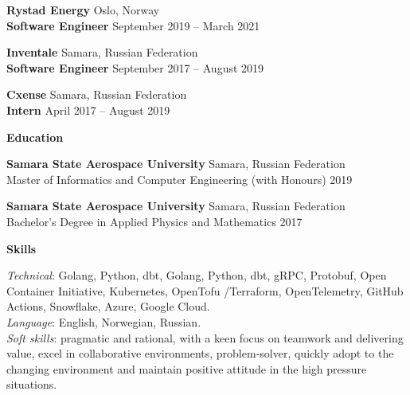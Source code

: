 \documentclass[12pt]{article}
\begin{document}
\vspace{10pt}

\textbf{Rystad Energy} \hfill Oslo, Norway \\
\textbf{Software Engineer} \hfill September 2019 – March 2021

\vspace{10pt}

\textbf{Inventale} \hfill Samara, Russian Federation \\
\textbf{Software Engineer} \hfill September 2017 – August 2019

\vspace{10pt}

\textbf{Cxense} \hfill Samara, Russian Federation \\
\textbf{Intern} \hfill April 2017 – August 2019

\hrulefill

\begin{center}
	\textbf{Education}
\end{center}

\textbf{Samara State Aerospace University} \hfill Samara, Russian Federation \\
Master of Informatics and Computer Engineering (with Honours) \hfill 2019

\textbf{Samara State Aerospace University} \hfill Samara, Russian Federation \\
Bachelor's Degree in Applied Physics and Mathematics \hfill 2017

\hrulefill

\begin{center}
	\textbf{Skills}
\end{center}

\textit{Technical}: Golang, Python, dbt, Golang, Python, dbt, gRPC, Protobuf, Open Container Initiative, Kubernetes, OpenTofu \slash Terraform, OpenTelemetry, GitHub Actions, Snowflake, Azure, Google Cloud. \\
\textit{Language}: English, Norwegian, Russian. \\
\textit{Soft skills}: pragmatic and rational, with a keen focus on teamwork and delivering value, excel in collaborative environments, problem-solver, quickly adopt to the changing environment and maintain positive attitude in the high pressure situations.
\end{document}
